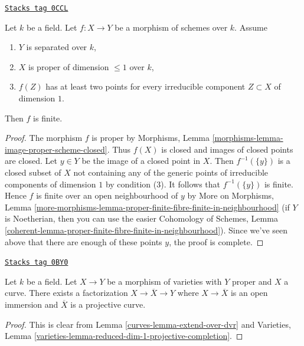 \begin{lemma}[Finite]
\label{curves-lemma-finite}
\href{https://stacks.math.columbia.edu/tag/0CCL}{\texttt{Stacks tag 0CCL}}

Let $k$ be a field. Let $f : X \to Y$ be a morphism of
schemes over $k$. Assume
\begin{enumerate}
\item $Y$ is separated over $k$,
\item $X$ is proper of dimension $\leq 1$ over $k$,
\item $f(Z)$ has at least two points for every irreducible
component $Z \subset X$ of dimension $1$.
\end{enumerate}
Then $f$ is finite.
\end{lemma}

\begin{proof}
The morphism $f$ is proper by
Morphisms, Lemma \ref{morphisms-lemma-image-proper-scheme-closed}.
Thus $f(X)$ is closed and images of closed points are closed.
Let $y \in Y$ be the image of a closed point in $X$.
Then $f^{-1}(\{y\})$ is a closed subset of $X$ not
containing any of the generic points of irreducible components
of dimension $1$ by condition (3). It follows that $f^{-1}(\{y\})$
is finite. Hence $f$ is finite over an open neighbourhood of $y$
by
More on Morphisms, Lemma
\ref{more-morphisms-lemma-proper-finite-fibre-finite-in-neighbourhood}
(if $Y$ is Noetherian, then you can use the easier
Cohomology of Schemes, Lemma
\ref{coherent-lemma-proper-finite-fibre-finite-in-neighbourhood}).
Since we've seen above that there are enough of these points
$y$, the proof is complete.
\end{proof}

\begin{lemma}
\label{curves-lemma-extend-to-completion}
\href{https://stacks.math.columbia.edu/tag/0BY0}{\texttt{Stacks tag 0BY0}}

Let $k$ be a field. Let $X \to Y$ be a morphism of varieties
with $Y$ proper and $X$ a curve.
There exists a factorization $X \to \overline{X} \to Y$
where $X \to \overline{X}$ is an open immersion
and $\overline{X}$ is a projective curve.
\end{lemma}

\begin{proof}

This is clear from Lemma \ref{curves-lemma-extend-over-dvr}
and Varieties, Lemma \ref{varieties-lemma-reduced-dim-1-projective-completion}.
\end{proof}

